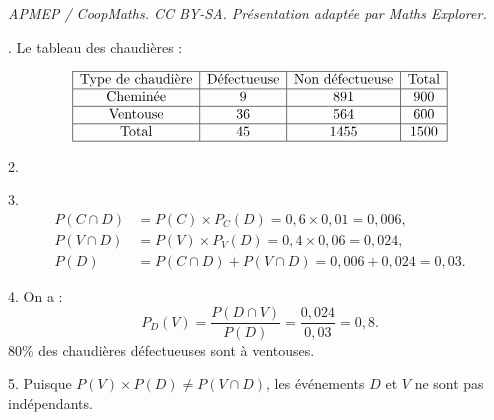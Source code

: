 \documentclass[10pt]{article}
\begin{document}
\noindent\textit{APMEP / CoopMaths. CC BY-SA. Présentation adaptée par Maths Explorer.}\par{}. Le tableau des chaudières :
	
	\[
\begin{array}{|c|c|c|c|}
	\hline
	\text{Type de chaudière} & \text{Défectueuse} & \text{Non défectueuse} & \text{Total} \\
	\hline
	\text{Cheminée} & 9 & 891 & 900 \\
		\hline
		\text{Ventouse} & 36 & 564 & 600 \\
	\hline
	\text{Total} & 45 & 1455 & 1500 \\
	\hline
\end{array}
	\]
	
	2. \begin{center}
	\end{center}
	3.
	\[
	\begin{aligned}
		P(C \cap D) &= P(C) \times P_C(D) = 0,6 \times 0,01 = 0,006, \\
		P(V \cap D) &= P(V) \times P_V(D) = 0,4 \times 0,06 = 0,024, \\
		P(D) &= P(C \cap D) + P(V \cap D) = 0,006 + 0,024 = 0,03.
	\end{aligned}
	\]
	
	4. On a :
	\[
	P_D(V) = \dfrac{P(D \cap V)}{P(D)} = \dfrac{0,024}{0,03} = 0,8.
	\]
	80\% des chaudières défectueuses sont à ventouses.
	
	5. Puisque $P(V) \times P(D) \neq P(V \cap D)$, les événements $D$ et $V$ ne sont pas indépendants.
\end{document}
